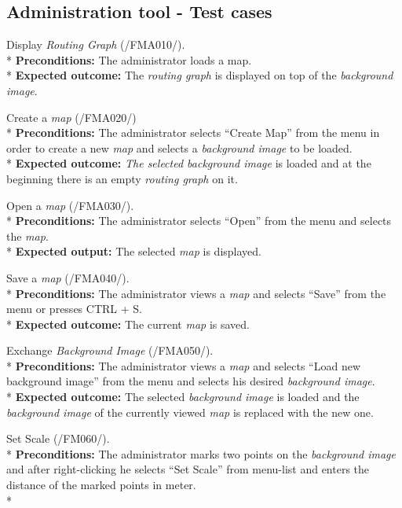 \subsection{Administration tool - Test cases}

\begin{numerate}[ATC]

\item Display \textit{Routing Graph} (/FMA010/). \\*
	\textbf{Preconditions:} The administrator loads a map. \\*
	\textbf{Expected outcome:} The \textit{routing graph} is displayed on top of the \textit{background image}.
\item Create a \textit{map} (/FMA020/)\\*
	\textbf{Preconditions:} The administrator selects ``Create Map'' from the menu in order to create a new \textit{map} and selects a \textit{background image} to be loaded. \\*
	\textbf{Expected outcome:} \textit{The selected background image} is loaded and at the beginning there is an empty \textit{routing graph} on it.
\item Open a \textit{map} (/FMA030/). \\*
	\textbf{Preconditions:} The administrator selects ``Open'' from the menu and selects the \textit{map}. \\*
	\textbf{Expected output:} The selected \textit{map} is displayed.
\item Save a \textit{map} (/FMA040/). \\*
	\textbf{Preconditions:} The administrator views a \textit{map} and selects ``Save'' from the menu or presses CTRL + S. \\*
	\textbf{Expected outcome:} The current \textit{map} is saved.
\item Exchange \textit{Background Image} (/FMA050/). \\*
	\textbf{Preconditions:} The administrator views a \textit{map} and selects ``Load new background image'' from the menu and selects his desired \textit{background image}. \\*
	\textbf{Expected outcome:} The selected \textit{background image} is loaded and the \textit{background image} of the currently viewed \textit{map} is replaced with the new one.
\item Set Scale (/FM060/). \\*
	\textbf{Preconditions:} The administrator marks two points on the \textit{background image} and after right-clicking he selects ``Set Scale'' from menu-list and enters the distance of the marked points in meter. \\*

\end{numerate}

